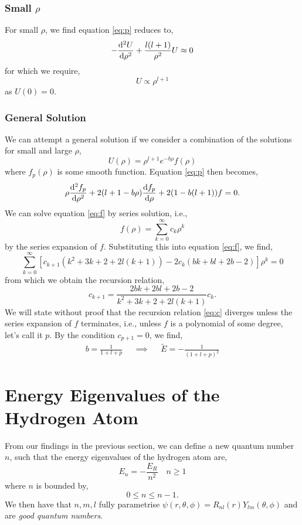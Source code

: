 \documentclass{book}
\begin{document}
\subsubsection{Small $\rho$}
For small $\rho$, we find equation \eqref{eq:p} reduces to,
\begin{equation}
	-\dv[2]{U}{\rho} + \frac{l(l+1)}{\rho^2}U \approx 0
\end{equation}
for which we require,
\begin{equation}
	U \propto \rho^{l+1}
\end{equation}
as $U(0) = 0$.
\subsubsection{General Solution}
We can attempt a general solution if we consider a combination of the solutions for small and large $\rho$,
\begin{equation}
	U(\rho) = \rho^{l+1}e^{-b\rho}f(\rho)
\end{equation}
where $f_p(\rho)$ is some smooth function. Equation \eqref{eq:p} then becomes,
\begin{equation}
	\rho\dv[2]{f_p}{\rho} + 2(l + 1 - b\rho)\dv{f_p}{\rho}  + 2(1 - b(l+1))f = 0. \label{eq:f}
\end{equation} 
We can solve equation \eqref{eq:f} by series solution, i.e.,
\begin{equation}
	f(\rho) = \sum_{k=0}^{\infty}c_k\rho^k
\end{equation}
by the series expansion of $f$. Substituting this into equation \eqref{eq:f}, we find,
\begin{equation}
	\sum_{k=0}^{\infty}\left[c_{k+1} \left(k^2 + 3k + 2 + 2l(k+1)\right) -2c_k\left(bk + bl + 2b - 2\right)\right]\rho^{k} = 0
\end{equation}
from which we obtain the recursion relation,
\begin{equation}
	c_{k+1} = \frac{2bk + 2bl + 2b - 2}{k^2 + 3k + 2 + 2l(k+1)}c_k. \label{eq:c}
\end{equation}
We will state without proof that the recursion relation \eqref{eq:c} diverges unless the series expansion of $f$ terminates, i.e., unless $f$ is a polynomial of some degree, let's call it $p$. By the condition $c_{p+1} = 0$, we find,
\begin{align}
	b = \frac{1}{1 + l + p} && \implies && \tilde{E} = -\frac{1}{(1 + l + p)^2}
\end{align}
\section{Energy Eigenvalues of the Hydrogen Atom}
From our findings in the previous section, we can define a new quantum number $n$, such that the energy eigenvalues of the hydrogen atom are,
\begin{equation}
	E_n = -\frac{E_R}{n^2} \hspace{1em} n \geq 1
\end{equation}
where $n$ is bounded by,
\begin{equation}
	 0 \leq n \leq n - 1.
\end{equation}
We then have that $n,m,l$ fully parametrise $\psi(r,\theta,\phi) = R_{nl}(r)Y_{lm}(\theta,\phi)$ and are \textit{good quantum numbers}.
\appendix
\end{document}
